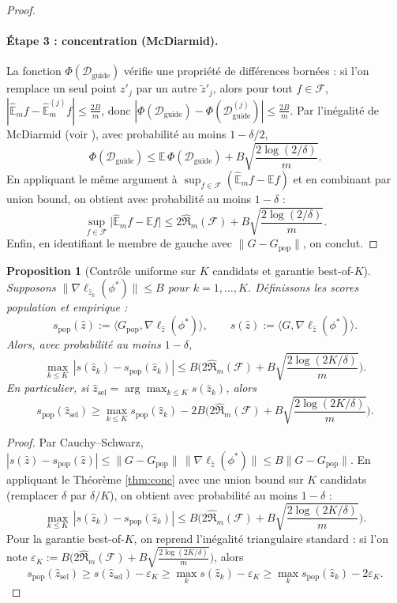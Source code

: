 \documentclass[11pt]{article}
\newtheorem{proposition}{Proposition}
\begin{document}
\begin{proof}
\paragraph{Étape 3 : concentration (McDiarmid).}
La fonction $\Phi(\mathcal D_{\text{guide}})$ vérifie une propriété de différences bornées :
si l'on remplace un seul point $z'_j$ par un autre $\tilde z'_j$, alors pour tout $f\in\mathcal F$,
$|\widehat{\mathbb E}_m f-\widehat{\mathbb E}_m^{(j)} f|\le \frac{2B}{m}$, donc
$|\Phi(\mathcal D_{\text{guide}})-\Phi(\mathcal D_{\text{guide}}^{(j)})|\le \frac{2B}{m}$.
Par l'inégalité de McDiarmid (voir \cite{biau_poly}), avec probabilité au moins $1-\delta/2$,
\[
\Phi(\mathcal D_{\text{guide}})
\le
\mathbb E\,\Phi(\mathcal D_{\text{guide}})
+
B\sqrt{\frac{2\log(2/\delta)}{m}}.
\]
En appliquant le même argument à $\sup_{f\in\mathcal F}(\widehat{\mathbb E}_m f-\mathbb E f)$ et en combinant par union bound,
on obtient avec probabilité au moins $1-\delta$ :
\[
\sup_{f\in\mathcal F}\Big|\widehat{\mathbb E}_m f-\mathbb E f\Big|
\le
2\widehat{\mathfrak R}_m(\mathcal F)
+
B\sqrt{\frac{2\log(2/\delta)}{m}}.
\]
Enfin, en identifiant le membre de gauche avec $\|G-G_{\text{pop}}\|$, on conclut.
\end{proof}

\begin{proposition}[Contrôle uniforme sur $K$ candidats et garantie best-of-$K$]
\label{prop:bestK}
Supposons $\|\nabla \ell_{\hat z_k}(\phi^*)\|\le B$ pour $k=1,\dots,K$.
Définissons les scores population et empirique :
\[
s_{\text{pop}}(\hat z):=\langle G_{\text{pop}},\nabla \ell_{\hat z}(\phi^*)\rangle,
\qquad
s(\hat z):=\langle G,\nabla \ell_{\hat z}(\phi^*)\rangle.
\]
Alors, avec probabilité au moins $1-\delta$,
\[
\max_{k\le K}\,|s(\hat z_k)-s_{\text{pop}}(\hat z_k)|
\le
B\Big(2\widehat{\mathfrak R}_m(\mathcal F)+B\sqrt{\frac{2\log(2K/\delta)}{m}}\Big).
\]
En particulier, si $\hat z_{\text{sel}}=\arg\max_{k\le K} s(\hat z_k)$, alors
\[
s_{\text{pop}}(\hat z_{\text{sel}})
\ge
\max_{k\le K} s_{\text{pop}}(\hat z_k)
-
2B\Big(2\widehat{\mathfrak R}_m(\mathcal F)+B\sqrt{\frac{2\log(2K/\delta)}{m}}\Big).
\]
\end{proposition}

\begin{proof}
Par Cauchy--Schwarz,
$|s(\hat z)-s_{\text{pop}}(\hat z)| \le \|G-G_{\text{pop}}\|\,\|\nabla \ell_{\hat z}(\phi^*)\| \le B\|G-G_{\text{pop}}\|$.
En appliquant le Théorème \ref{thm:conc} avec une union bound sur $K$ candidats (remplacer $\delta$ par $\delta/K$), on obtient avec probabilité au moins $1-\delta$ :
\[
\max_{k\le K}\,|s(\hat z_k)-s_{\text{pop}}(\hat z_k)|
\le
B\Big(2\widehat{\mathfrak R}_m(\mathcal F)+B\sqrt{\frac{2\log(2K/\delta)}{m}}\Big).
\]
Pour la garantie best-of-$K$, on reprend l'inégalité triangulaire standard : si l'on note
$\varepsilon_K:=B\big(2\widehat{\mathfrak R}_m(\mathcal F)+B\sqrt{\tfrac{2\log(2K/\delta)}{m}}\big)$, alors
\[
s_{\text{pop}}(\hat z_{\text{sel}})
\ge s(\hat z_{\text{sel}})-\varepsilon_K
\ge \max_k s(\hat z_k)-\varepsilon_K
\ge \max_k s_{\text{pop}}(\hat z_k)-2\varepsilon_K.
\]
\end{proof}
\end{document}
